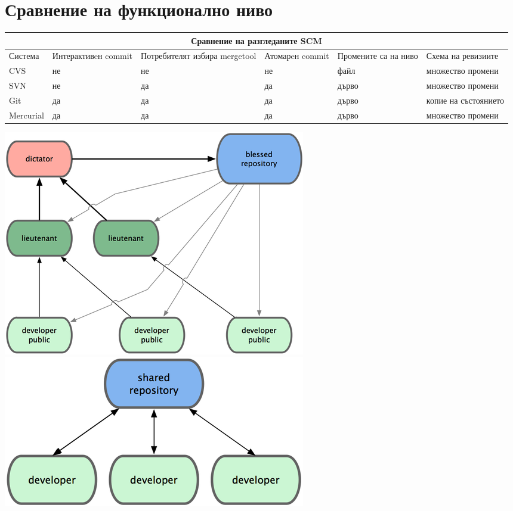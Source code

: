 \documentclass[a4paper]{article}
\begin{document}
\section{Сравнение на функционално ниво}
  \begin{tabular} { | l | p{22 mm} | p{21 mm} | p{14 mm} | p{17 mm} | p{34 mm} |}
  \multicolumn{6}{c}{Сравнение на разгледаните SCM} \\
  \hline
  Система     & Интерактивeн commit & Потребителят избира mergetool & Атомарeн commit & Промените са на ниво & Схема на ревизиите \\
  \hline
  CVS         & не                  & не                            & не              & файл                 & множество промени \\
  SVN         & не                  & да                            & да              & дърво                & множество промени \\
  Git         & да                  & да                            & да              & дърво                & копие на състоянието \\
  Mercurial   & да                  & да                            & да              & дърво                & множество промени\\
  \hline
  \end{tabular}

  \vspace{10 pt}

  \includegraphics[scale=1.0]{benevolent_dictator_workflow.png}
  \includegraphics[scale=1.0]{centralized_workflow.png}
\end{document}
